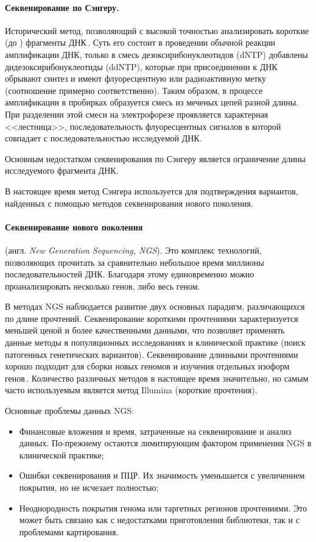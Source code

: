 \documentclass[a4paper,14pt]{extarticle}
\newcommand{\engterm}[1]{англ. \textenglish{\textit{#1}}}
\begin{document}
\paragraph{Секвенирование по Сэнгеру.}
Исторический метод, позволяющий с высокой точностью анализировать короткие (до ) фрагменты ДНК\,\citep{Sanger_1977}.
Суть его состоит в проведении обычной реакции амплификации ДНК, только в смесь дезоксирибонуклеотидов (dNTP) добавлены дидезоксирибонуклеотиды (ddNTP), которые при присоединении к ДНК обрывают синтез и имеют флуоресцентную или радиоактивную метку (соотношение примерно  соответственно).
Таким образом, в процессе амплификации в пробирках образуется смесь из меченых цепей разной длины.
При разделении этой смеси на электрофорезе проявляется характерная <<лестница>>, последовательность флуоресцентных сигналов в которой совпадает с последовательностью исследуемой ДНК.

Основным недостатком секвенирования по Сэнгеру является ограничение длины исследуемого фрагмента ДНК.

В настоящее время метод Сэнгера используется для подтверждения вариантов, найденных с помощью методов секвенирования нового поколения.

\paragraph{Секвенирование нового поколения} (\engterm{New Generation Sequencing, NGS}).
Это комплекс технологий, позволяющих прочитать за сравнительно небольшое время миллионы последовательностей ДНК.
Благодаря этому единовременно можно проанализировать несколько генов, либо весь геном.

В методах NGS наблюдается развитие двух основных парадигм, различающихся по длине прочтений.
Секвенирование короткими прочтениями характеризуется меньшей ценой и более качественными данными, что позволяет применять данные методы в популяционных исследованиях и клинической практике (поиск патогенных генетических вариантов).
Секвенирование длинными прочтениями хорошо подходит для сборки новых геномов и изучения отдельных изоформ генов\,\citep{Goodwin_2016}.
Количество различных методов в настоящее время значительно, но самым часто используемым является метод Illumina (короткие прочтения).

Основные проблемы данных NGS:

\begin{itemize}
	\item Финансовые вложения и время, затраченные на секвенирование и анализ данных.
	      По-прежнему остаются лимитирующим фактором применения NGS в клинической практике;
	\item Ошибки секвенирования и ПЦР.
	      Их значимость уменьшается с увеличением покрытия, но не исчезает полностью;
	\item Неоднородность покрытия генома или таргетных регионов прочтениями.
	      Это может быть связано как с недостатками приготовления библиотеки, так и с проблемами картирования.
\end{itemize}
\end{document}
